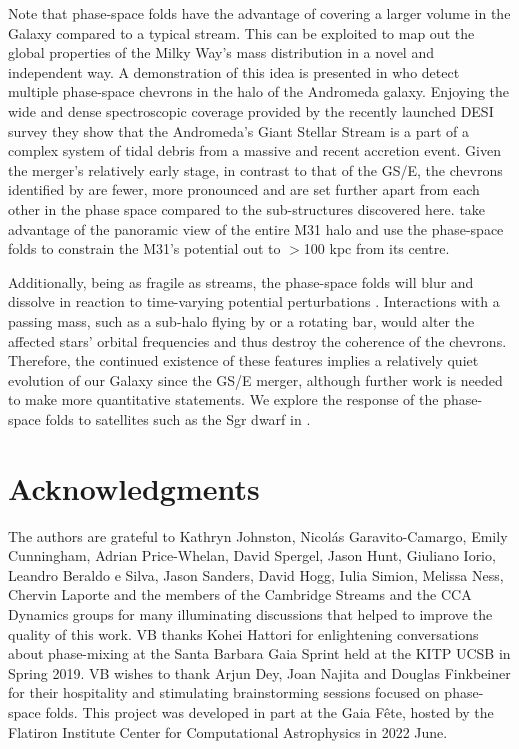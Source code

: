 \documentclass[a4paper,useAMS,usenatbib]{mnras}
\begin{document}
Note that phase-space folds have the advantage of covering a larger volume in the Galaxy compared to a typical stream. This can be exploited to map out the global properties of the Milky Way's mass distribution in a novel and independent way. A demonstration of this idea is presented in \citet{Dey2022} who detect multiple phase-space chevrons in the halo of the Andromeda galaxy. Enjoying the wide and dense spectroscopic coverage provided by the recently launched DESI survey they show that the Andromeda's Giant Stellar Stream is a part of a complex system of tidal debris from a massive and recent accretion event. Given the merger's relatively early stage, in contrast to that of the GS/E, the chevrons identified by \citet{Dey2022} are fewer, more pronounced and are set further apart from each other in the phase space compared to the sub-structures discovered here. \citet{Dey2022} take advantage of the panoramic view of the entire M31 halo and use the  phase-space folds to constrain the M31's potential out to $>$100 kpc from its centre. 

Additionally, being as fragile as streams, the phase-space folds will blur and dissolve in reaction to time-varying potential perturbations \citep[also see][for a discussion of additional effects that can lead to the dissolution of the phase-space sub-structure]{Leandro2019evo}. Interactions with a passing mass, such as a sub-halo flying by or a rotating bar, would alter the affected stars' orbital frequencies and thus destroy the coherence of the chevrons. Therefore, the continued existence of these features implies a relatively quiet evolution of our Galaxy since the GS/E merger, although further work is needed to make more quantitative statements. We explore the response of the phase-space folds to satellites such as the Sgr dwarf in \citet{Davies2022}. 

\section*{Acknowledgments}

The authors are grateful to Kathryn Johnston, Nicol\'as Garavito-Camargo, Emily Cunningham, Adrian Price-Whelan, David Spergel, Jason Hunt, Giuliano Iorio, Leandro Beraldo e Silva, Jason Sanders, David Hogg, Iulia Simion, Melissa Ness, Chervin Laporte and the members of the Cambridge Streams and the CCA Dynamics groups for many illuminating discussions that helped to improve the quality of this work. VB thanks Kohei Hattori for enlightening conversations about phase-mixing at the Santa Barbara Gaia Sprint held at the KITP UCSB in Spring 2019. VB wishes to thank Arjun Dey, Joan Najita and Douglas Finkbeiner for their hospitality and stimulating brainstorming sessions focused on phase-space folds. This project was developed in part at the Gaia F\^ete, hosted by the Flatiron Institute Center for Computational Astrophysics in 2022 June.
\end{document}
